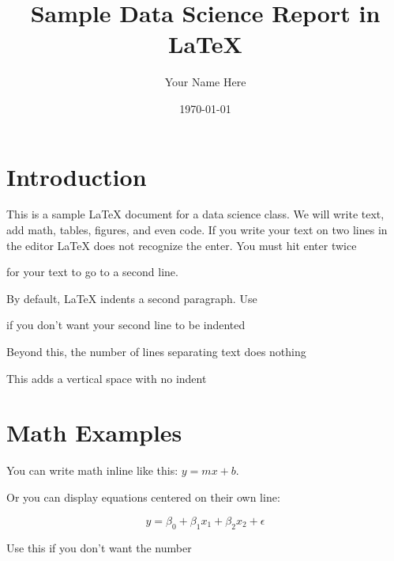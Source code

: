 \documentclass[12pt]{article}
\title{Sample Data Science Report in LaTeX}
\author{Your Name Here}
\date{\today} %
\begin{document}
\maketitle

\section{Introduction}

This is a sample \LaTeX{} document for a data science class. 
We will write text, add math, tables, figures, and even code.
If you write your text on two lines in the editor
LaTeX does not recognize the enter.
You must hit enter twice

for your text to go to a second line.

By default, LaTeX indents a second paragraph. Use 

\noindent if you don't want your second line to be indented




Beyond this, the number of lines separating text does nothing

\vspace{1em} \noindent This adds a vertical space with no indent



\section{Math Examples}

You can write math inline like this: $y = mx + b$.

Or you can display equations centered on their own line:

\begin{equation}
    \hat{y} = \beta_0 + \beta_1 x_1 + \beta_2 x_2 + \epsilon
\end{equation}


Use this if you don't want the number
\end{document}

